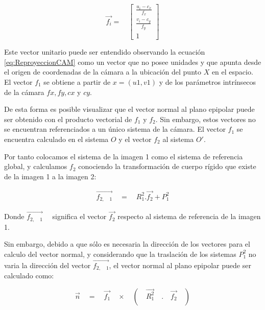 \begin{equation}
\overset { \rightarrow  }{ { f }_{ i } } =\quad \left[ \begin{matrix} \frac { u_{ i }-{ c }_{ x } }{ { f }_{ x } }  \\ \frac { { v }_{ i }-{ c }_{ y } }{ { f }_{ y } }  \\ 1 \end{matrix} \right] 
\end{equation}

Este vector unitario puede ser entendido observando la ecuación \ref{eq:ReproyeccionCAM} como un vector que no posee unidades y que apunta desde el origen de coordenadas de la cámara a la ubicación del punto $X$ en el espacio. El vector ${ f }_{ 1}$ se obtiene a partir  de $x = (u1,v1)$  y de los parámetros intrínsecos de la cámara $fx, fy, cx$ y $cy$.

De esta forma es posible visualizar que el vector normal al plano epipolar puede ser obtenido con el producto vectorial de ${ f }_{ 1}$ y ${ f }_{ 2}$. Sin embargo, estos vectores no se encuentran referenciados a un único sistema de la cámara. El vector ${ f }_{ 1}$ se encuentra calculado en el sistema $O$ y el vector ${ f }_{ 2}$ al sistema $O'$. 

Por tanto colocamos el sistema de la imagen 1 como el sistema de referencia global, y calculamos  ${ f }_{ 2}$ 
conociendo la transformación de cuerpo rígido que existe de la imagen 1 a la imagen 2:

\begin{equation}
\begin{matrix} \overset { \rightarrow  }{ { f }_{ 2,\quad 1 } } \quad =\quad { R }_{ 1 }^{ 2 }.\overset { \rightarrow  }{ { f }_{ 2 } } +{ P }_{ 1 }^{ 2 } \end{matrix}
\end{equation}

Donde $\overset { \rightarrow  }{ { f }_{ 2,\quad 1 } } \quad $ significa el vector $\overset { \rightarrow  }{ { f }_{ 2 } } $ respecto al sistema de referencia de la imagen 1.

Sin embargo, debido a que sólo es necesaria la dirección de los vectores para el calculo del vector normal, y considerando que la traslación de los sistemas ${ P }_{ 1 }^{ 2 }$ no varia la dirección del vector $\overset { \rightarrow  }{ { f }_{ 2,\quad 1 } }$, el vector normal al plano epipolar puede ser calculado como:


\begin{equation}
\overset { \rightarrow  }{ n } \quad =\quad \overset { \rightarrow  }{ { f }_{ 1 } } \quad \times \quad (\quad \overset { \rightarrow  }{ { { R }_{ 1 }^{ 2 } } } \quad .\quad \overset { \rightarrow  }{ { f }_{ 2 } } \quad )
\label{eq:normalEpipolar}
\end{equation}


